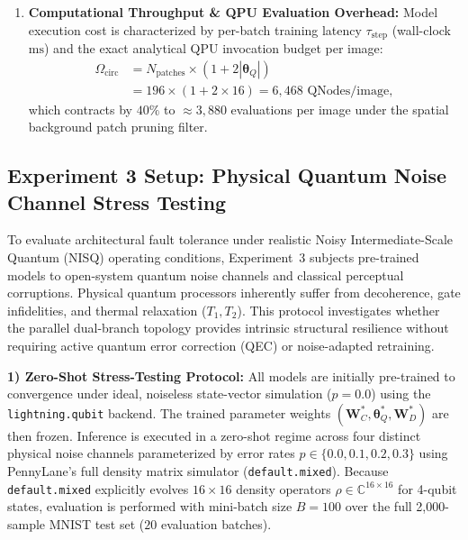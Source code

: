 \documentclass[pdflatex,sn-mathphys-num]{sn-jnl}%
\theoremstyle{thmstyleone}%
\theoremstyle{thmstyletwo}%
\theoremstyle{thmstylethree}%
\begin{document}
\begin{enumerate}
    \item \textbf{Computational Throughput \& QPU Evaluation Overhead:} Model execution cost is characterized by per-batch training latency $\tau_{\mathrm{step}}$ (wall-clock $\mathrm{ms}$) and the exact analytical QPU invocation budget per image:
    \begin{align}
    \Omega_{\mathrm{circ}} &= N_{\mathrm{patches}} \times \left( 1 + 2 |\boldsymbol{\theta}_Q| \right) \nonumber \\
    &= 196 \times (1 + 2 \times 16) = 6{,}468 \text{ QNodes/image},
    \label{eq:qnode_budget_analytical}
    \end{align}
    which contracts by $40\%$ to $\approx 3{,}880$ evaluations per image under the spatial background patch pruning filter.
\end{enumerate}

\subsection{Experiment 3 Setup: Physical Quantum Noise Channel Stress Testing}
\label{subsec:exp3_setup}
To evaluate architectural fault tolerance under realistic Noisy Intermediate-Scale Quantum (NISQ) operating conditions, Experiment~3 subjects pre-trained models to open-system quantum noise channels and classical perceptual corruptions. Physical quantum processors inherently suffer from decoherence, gate infidelities, and thermal relaxation ($T_1, T_2$). This protocol investigates whether the parallel dual-branch topology provides intrinsic structural resilience without requiring active quantum error correction (QEC) or noise-adapted retraining.

\textbf{1) Zero-Shot Stress-Testing Protocol:}
All models are initially pre-trained to convergence under ideal, noiseless state-vector simulation ($p = 0.0$) using the \texttt{lightning.qubit} backend. The trained parameter weights $(\mathbf{W}_C^*, \boldsymbol{\theta}_Q^*, \mathbf{W}_D^*)$ are then frozen. Inference is executed in a zero-shot regime across four distinct physical noise channels parameterized by error rates $p \in \{0.0, 0.1, 0.2, 0.3\}$ using PennyLane's full density matrix simulator (\texttt{default.mixed}). Because \texttt{default.mixed} explicitly evolves $16 \times 16$ density operators $\rho \in \mathbb{C}^{16 \times 16}$ for 4-qubit states, evaluation is performed with mini-batch size $B = 100$ over the full 2,000-sample MNIST test set ($20$ evaluation batches).
\end{document}
